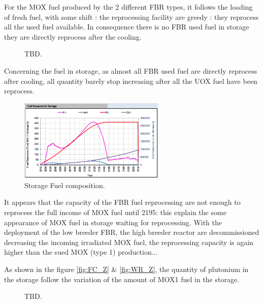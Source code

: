 \documentclass[12pt]{article}
\begin{document}
 For the MOX fuel produced by the 2 different FBR types, it follows the loading of fresh fuel, with some shift : the reprocessing facility are greedy : they reprocess all the used fuel available. In consequence there is no FBR used fuel in storage they are directly reprocess after the cooling.


\begin{figure}[h!]
\centering
{}
\caption{TBD.\label{fig:cool_reprocc} }
\end{figure}


Concerning the fuel in storage, as almost all FBR used fuel are directly reprocess after cooling, all quantity barely stop increasing after all the UOX fuel have been reprocess. 

\begin{figure}[h!]
\centering
\includegraphics[width=0.62\textwidth]{img/FuelInStorage_1} 
\caption{Storage Fuel composition.}
 \label{fig:storagecompo_1}
\end{figure}
 
It appears that the capacity of the FBR fuel reprocessing are not enough to reprocess the full income of MOX fuel until 2195: this explain the some appearance of MOX fuel in storage waiting for reprocessing. With the deployment of the low breeder FBR, the high breeder reactor are decommissioned decreasing the incoming irradiated MOX fuel,  the reprocessing capacity is again higher than the sued MOX (type 1) production...


As shown in the figure \ref{fig:FC_Z} \& \ref{fig:WR_Z}, the quantity of plutonium in the storage follow the variation of the amount of MOX1 fuel in the storage.
	
\begin{figure}[h!]
\centering
{}
\caption{TBD.\label{fig:FC_WR_zoom} }
\end{figure}
\end{document}
